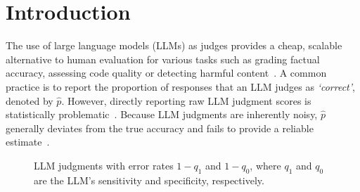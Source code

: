 \section{Introduction}\label{sec:introduction}

The use of large language models (LLMs) as judges provides a cheap, scalable alternative to human evaluation for various tasks such as grading factual accuracy, assessing code quality or detecting harmful content~\citep{zheng2023judging, liu2023g, wang-etal-2023-chatgpt, li-etal-2025-generation, gu2024survey}. A common practice is to report the proportion of responses that an LLM judges as \emph{`correct'}, denoted by $\hat{p}$.
However, directly reporting raw LLM judgment scores is statistically problematic~\citep{bross1954misclassification, schwartz1985neglected, forman2005counting, angelopoulos2023prediction, boyeau2025autoeval, fraser2024estimating, albinet2025llmjudge}.
Because LLM judgments are inherently noisy, $\hat{p}$ generally deviates from the true accuracy and fails to provide a reliable estimate~\citep{wang-etal-2024-large-language-models-fair, koo-etal-2024-benchmarking, huang-etal-2025-empirical}.

\begin{figure}
  \centering
  \caption{LLM judgments with error rates $1-q_1$ and $1-q_0$, where $q_1$ and $q_0$ are the LLM's sensitivity and specificity, respectively.}
  \label{fig:q0q1}
\end{figure}


